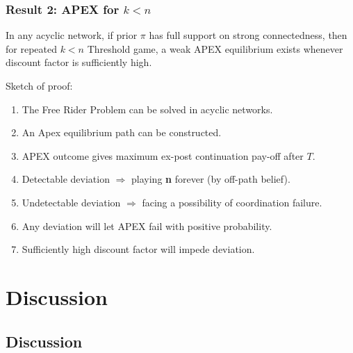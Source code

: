 \documentclass[8pt]{beamer}
\begin{document}
\begin{frame}
\frametitle{Result 2: APEX for $k<n$}
\begin{theorem}[$k< n$]
\label{thm_main_result}
In any \alert{acyclic} network, if prior $\pi$ has \alert{full support on strong connectedness}, then for repeated $k<n$ Threshold game, a {weak} APEX equilibrium {exists} whenever discount factor is sufficiently high.
\end{theorem}
Sketch of proof:
\begin{enumerate}
\item The Free Rider Problem can be solved in acyclic networks.
\item An Apex equilibrium path can be constructed.
\item APEX outcome gives maximum ex-post continuation pay-off after $T$.
\item Detectable deviation $\Rightarrow$ playing \textbf{n} forever (by off-path belief).
\item Undetectable deviation $\Rightarrow$ facing a possibility of coordination failure.
\item Any deviation will let APEX fail with positive probability.
\item Sufficiently high discount factor will impede deviation.
\end{enumerate}



\end{frame}


\section{Discussion}
\subsection{Discussion}
\end{document}
